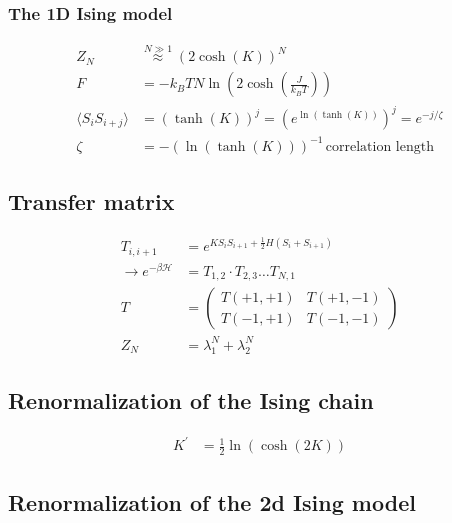 \subsubsection*{The 1D Ising model}
\begin{equation*}
    \begin{aligned}
        Z_N &\overset{N \gg 1}{\approx} (2 \cosh(K))^N \\
        F &= -k_B TN \ln \left( 2 \cosh \left(\frac{J}{k_B T}\right) \right) \\
        \langle S_i S_{i+j} \rangle &= (\tanh(K))^j = \left(e^{\ln(\tanh(K))}\right)^j = e^{-j/\zeta} \\
        \zeta &= -(\ln(\tanh(K)))^{-1} \, \text{correlation length}
    \end{aligned}
\end{equation*}

\subsection*{Transfer matrix}
\begin{equation*}
    \begin{aligned}
        T_{i,i+1} &= e^{KS_iS_{i+1} + \frac{1}{2}H(S_i + S_{i+1})} \\
        \rightarrow e^{-\beta \mathcal{H}} &= T_{1,2} \cdot T_{2,3} \dots T_{N,1}\\
        T &= \begin{pmatrix}
            T(+1,+1) & T(+1,-1)  \\
            T(-1,+1) & T(-1,-1)   
            \end{pmatrix} \\
        Z_N &= \lambda_1^N + \lambda_2^N
    \end{aligned}
\end{equation*}

\subsection*{Renormalization of the Ising chain}
\begin{equation*}
    \begin{aligned}
        K^{'} &= \frac{1}{2} \ln (\cosh (2K))
    \end{aligned}
\end{equation*}

\subsection*{Renormalization of the 2d Ising model}

